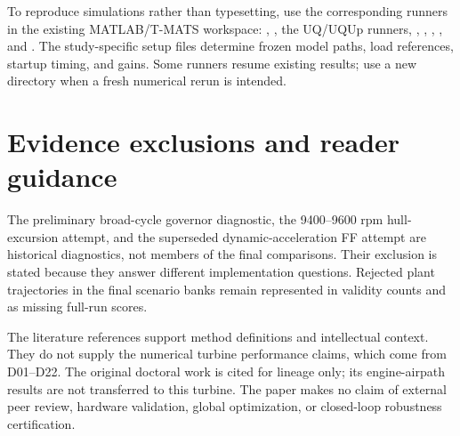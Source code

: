 To reproduce simulations rather than typesetting, use the corresponding runners in the existing MATLAB/T-MATS workspace: , , the UQ/UQUp runners, , , , , and . The study-specific setup files determine frozen model paths, load references, startup timing, and gains. Some runners resume existing results; use a new directory when a fresh numerical rerun is intended.

\section{Evidence exclusions and reader guidance}
The preliminary broad-cycle governor diagnostic, the 9400--9600 rpm hull-excursion attempt, and the superseded dynamic-acceleration FF attempt are historical diagnostics, not members of the final comparisons. Their exclusion is stated because they answer different implementation questions. Rejected plant trajectories in the final scenario banks remain represented in validity counts and as missing full-run scores.

The literature references support method definitions and intellectual context. They do not supply the numerical turbine performance claims, which come from D01--D22. The original doctoral work is cited for lineage only; its engine-airpath results are not transferred to this turbine. The paper makes no claim of external peer review, hardware validation, global optimization, or closed-loop robustness certification.

\clearpage
